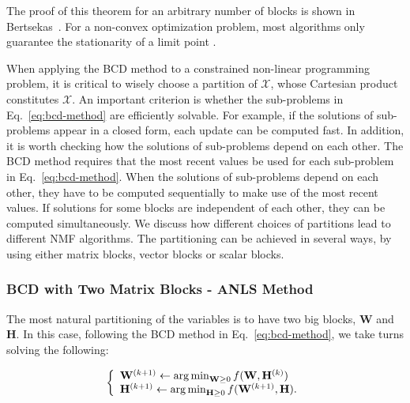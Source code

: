 The proof of this theorem for an arbitrary number of blocks is shown
in Bertsekas~\cite{Bertsekas1999}.
For a non-convex optimization problem, most algorithms only guarantee
the stationarity of a limit point \cite{Lin2007}.

When applying the BCD method to a constrained non-linear programming
problem, it is critical to wisely choose a partition of
$\mathcal{X}$, whose Cartesian product constitutes $\mathcal{X}$. An
important criterion is whether the sub-problems in
Eq.~\eqref{eq:bcd-method} are efficiently solvable. For example, if
the solutions of sub-problems appear in a closed form, each update
can be computed fast. In addition, it is worth checking how the
solutions of sub-problems depend on each other. The BCD method
requires that the most recent values be used for each sub-problem in
Eq.~\eqref{eq:bcd-method}. When the solutions of sub-problems depend
on each other, they have to be computed sequentially to make use of
the most recent values. If solutions for some blocks are independent
of each other,  they can be computed simultaneously. We discuss how
different choices of partitions lead to different NMF algorithms.
The  partitioning can be achieved in several ways, by using either
matrix blocks, vector blocks or scalar blocks.

\subsubsection{BCD with Two Matrix Blocks - ANLS Method}
The most natural partitioning of the variables is to have two big
blocks, $\mathbf{W}$ and $\mathbf{H}$. In this case, following the
BCD method in Eq.~\eqref{eq:bcd-method}, we take turns solving the
following:

\begin{equation}
\left\{
  \begin{array}{ll}
  \mathbf{W}^{(k+1)}\leftarrow\mathop{\rm arg\,min}_{\mathbf{W}\ge0}f(\mathbf{W},\mathbf{H}^{(k)})\\ 
\mathbf{H}^{(k+1)}\leftarrow\mathop{\rm arg\,min}_{\mathbf{H}\ge0}f(\mathbf{W}^{(k+1)},\mathbf{H}).  
\end{array}
\right.\label{bcd}
\end{equation}




